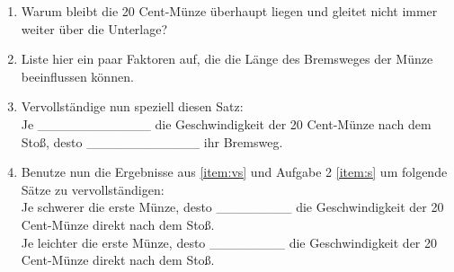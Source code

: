 \documentclass[task=1]{exercise}
\begin{document}
  \begin{enumerate}[label=\textnormal{\roman*)}]
   \item Warum bleibt die 20 Cent-M\"unze \"uberhaupt liegen und gleitet nicht immer weiter \"uber die Unterlage?\\
   \vspace{3cm}
   \item Liste hier ein paar Faktoren auf, die die L\"ange des Bremsweges der M\"unze beeinflussen k\"onnen.\\
   \vspace{3cm}
   \item\label{item:vs} Vervollst\"andige nun speziell diesen Satz:\\
   Je \_\_\_\_\_\_\_\_\_\_\_\_ die Geschwindigkeit der 20 Cent-M\"unze nach dem Sto{\ss}, desto \_\_\_\_\_\_\_\_\_\_\_\_ ihr Bremsweg.
   \item Benutze nun die Ergebnisse aus \ref{item:vs} und Aufgabe 2 \ref{item:s} um folgende S\"atze zu vervollst\"andigen:\\
   Je schwerer die erste M\"unze, desto \_\_\_\_\_\_\_\_ die Geschwindigkeit der 20 Cent-M\"unze direkt nach dem Sto{\ss}.\\
   Je leichter die erste M\"unze, desto \_\_\_\_\_\_\_\_ die Geschwindigkeit der 20 Cent-M\"unze direkt nach dem Sto{\ss}.
   
  \end{enumerate}
  
  
\end{document}
